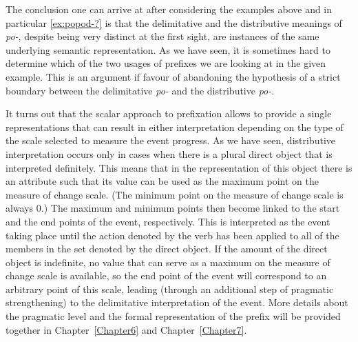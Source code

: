The conclusion one can arrive at after considering the examples above and in particular \ref{ex:popod-?} is that the delimitative and the distributive meanings of \textit{po-}, despite being very distinct at the first sight, are instances of the same underlying semantic representation. As we have seen, it is sometimes hard to determine which of the two usages of prefixes we are looking at in the given example. This is an argument if favour of abandoning the hypothesis of a strict boundary between the delimitative \textit{po-} and the distributive \textit{po-}.

It turns out that the scalar approach to prefixation allows to provide a single representations that can result in either interpretation depending on the type of the scale selected to measure the event progress. As we have seen, distributive interpretation occurs only in cases when there is a plural direct object that is interpreted definitely. This means that in the representation of this object there is an attribute such that its value can be used as the maximum point on the measure of change scale. (The minimum point on the measure of change scale is always 0.) The maximum and minimum points then become linked to the start and the end points of the event, respectively. This is interpreted as the event taking place until the action denoted by the verb has been applied to all of the members in the set denoted by the direct object. If the amount of the direct object is indefinite, no value that can serve as a maximum on the measure of change scale is available, so the end point of the event will correspond to an arbitrary point of this scale, leading (through an additional step of pragmatic strengthening) to the delimitative interpretation of the event. More details about the pragmatic level and the formal representation of the prefix will be provided together in Chapter~\ref{Chapter6} and Chapter~\ref{Chapter7}.

